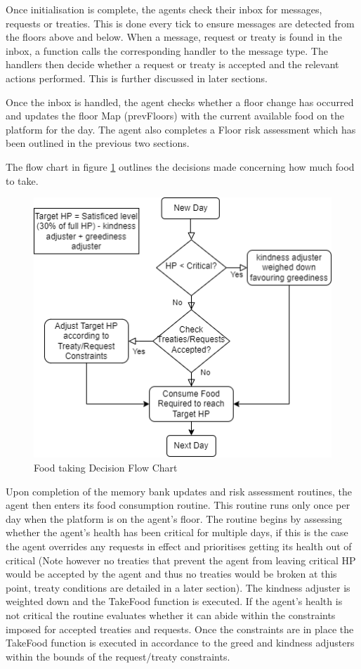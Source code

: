 Once initialisation is complete, the agents check their inbox for messages, requests or treaties. This is done every tick to ensure messages are detected from the floors above and below. When a message, request or treaty is found in the inbox, a function calls the corresponding handler to the message type. The handlers then decide whether a request or treaty is accepted and the relevant actions performed. This is further discussed in later sections. 

Once the inbox is handled, the agent checks whether a floor change has occurred and updates the floor Map (prevFloors) with the current available food on the platform for the day. The agent also completes a Floor risk assessment which has been outlined in the previous two sections. 

The flow chart in figure \ref{fig: operation flow chart} outlines the decisions made concerning how much food to take.

\begin{figure}[h!]
    \begin{center}
        \includegraphics[scale=0.75]{Images/v2.drawio.png}
    \end{center}
    \caption{Food taking Decision Flow Chart}
    \label{fig: operation flow chart}
\end{figure}

Upon completion of the memory bank updates and risk assessment routines, the agent then enters its food consumption routine. This routine runs only once per day when the platform is on the agent's floor. The routine begins by assessing whether the agent's health has been critical for multiple days, if this is the case the agent overrides any requests in effect and prioritises getting its health out of critical (Note however no treaties that prevent the agent from leaving critical HP would be accepted by the agent and thus no treaties would be broken at this point, treaty conditions are detailed in a later section). The kindness adjuster is weighted down and the TakeFood function is executed. If the agent's health is not critical the routine evaluates whether it can abide within the constraints imposed for accepted treaties and requests. Once the constraints are in place the TakeFood function is executed in accordance to the greed and kindness adjusters within the bounds of the request/treaty constraints. 

